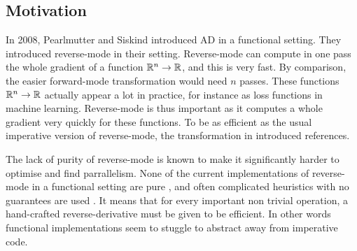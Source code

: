 
\subsection{Motivation}

In 2008, Pearlmutter and Siskind \cite{pearlmutter2008reverse} introduced AD in a functional setting. 
They introduced reverse-mode in their setting. 
Reverse-mode can compute in one pass the whole gradient of a function $\mathbb{R}^n\to\mathbb{R}$, and this is very fast.
By comparison, the easier forward-mode transformation would need $n$ passes. 
These functions $\mathbb{R}^n\to\mathbb{R}$ actually appear a lot in practice, for instance as loss functions in machine learning.
Reverse-mode is thus important as it computes a whole gradient very quickly for these functions. 
To be as efficient as the usual imperative version of reverse-mode, the transformation in \cite{pearlmutter2008reverse} introduced references.

The lack of purity of reverse-mode is known to make it significantly harder to optimise and find parrallelism. 
None of the current implementations of reverse-mode in a functional setting are pure \cite{}, and often complicated heuristics with no guarantees are used \cite{}.
It means that for every important non trivial operation, a hand-crafted reverse-derivative must be given to be efficient.
In other words functional implementations seem to stuggle to abstract away from imperative code.

